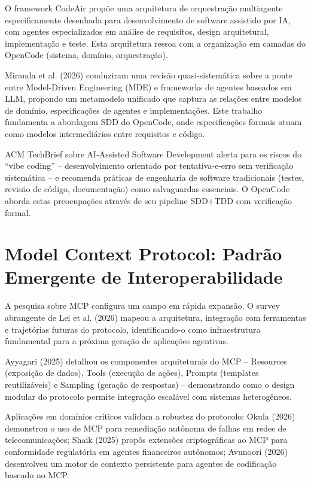 \documentclass[12pt,a4paper,sumario=tradicional]{abntex2}
\begin{document}
O framework CodeAir \cite{rangel2026codeair} propõe uma arquitetura de orquestração multiagente especificamente desenhada para desenvolvimento de software assistido por IA, com agentes especializados em análise de requisitos, design arquitetural, implementação e teste. Esta arquitetura ressoa com a organização em camadas do OpenCode (sistema, domínio, orquestração).

Miranda et al. (2026) \cite{miranda2026bridging} conduziram uma revisão quasi-sistemática sobre a ponte entre Model-Driven Engineering (MDE) e frameworks de agentes baseados em LLM, propondo um metamodelo unificado que captura as relações entre modelos de domínio, especificações de agentes e implementações. Este trabalho fundamenta a abordagem SDD do OpenCode, onde especificações formais atuam como modelos intermediários entre requisitos e código.

ACM TechBrief sobre AI-Assisted Software Development \cite{garfinkel2026acm} alerta para os riscos do ``vibe coding'' -- desenvolvimento orientado por tentativa-e-erro sem verificação sistemática -- e recomenda práticas de engenharia de software tradicionais (testes, revisão de código, documentação) como salvaguardas essenciais. O OpenCode aborda estas preocupações através de seu pipeline SDD+TDD com verificação formal.

\section{Model Context Protocol: Padrão Emergente de Interoperabilidade}

A pesquisa sobre MCP configura um campo em rápida expansão. O survey abrangente de Lei et al. (2026) \cite{lei2026survey} mapeou a arquitetura, integração com ferramentas e trajetórias futuras do protocolo, identificando-o como infraestrutura fundamental para a próxima geração de aplicações agentivas.

Ayyagari (2025) \cite{ayyagari2025mcp} detalhou os componentes arquiteturais do MCP -- Resources (exposição de dados), Tools (execução de ações), Prompts (templates reutilizáveis) e Sampling (geração de respostas) -- demonstrando como o design modular do protocolo permite integração escalável com sistemas heterogêneos.

Aplicações em domínios críticos validam a robustez do protocolo: Okula (2026) \cite{okula2026era} demonstrou o uso de MCP para remediação autônoma de falhas em redes de telecomunicações; Shaik (2025) \cite{shaik2025cbi} propôs extensões criptográficas ao MCP para conformidade regulatória em agentes financeiros autônomos; Avunoori (2026) \cite{avunoori2026aesp} desenvolveu um motor de contexto persistente para agentes de codificação baseado no MCP.
\end{document}
